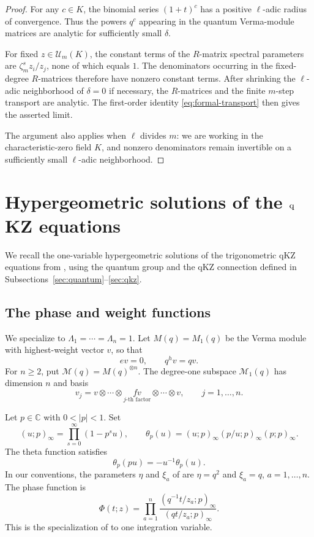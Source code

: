 \documentclass[12pt]{amsart}
\theoremstyle{definition}
\numberwithin{equation}{section}
\theoremstyle{definition}
\let\mc\mathcal
\let\La\Lambda
\let\tht\theta
\let\ox\otimes
\let\ge\geqslant
\def\C{{\mathbb C}}
\def\beq{\begin{equation}}
\def\eeq{\end{equation}}
\begin{document}
\begin{proof}
For any $c\in K$, the binomial series $(1+t)^c$ has a
positive $\ell$-adic radius of convergence.  Thus the powers
$q^c$ appearing in the quantum Verma-module matrices are
analytic for sufficiently small $\delta$.

For fixed $z\in\mc U_m(K)$, the constant terms of the
$R$-matrix spectral parameters are
$\zeta_m^s z_i/z_j$, none of which equals $1$.
The denominators occurring in the fixed-degree $R$-matrices
therefore have nonzero constant terms.  After shrinking
the $\ell$-adic neighborhood of $\delta=0$ if necessary,
the $R$-matrices and the finite $m$-step transport are analytic.
The first-order identity \eqref{eq:formal-transport} then
gives the asserted limit.

The argument also applies when $\ell$ divides $m$:
we are working in the characteristic-zero field $K$,
and nonzero denominators remain invertible on a sufficiently
small $\ell$-adic neighborhood.
\end{proof}



\section{Hypergeometric solutions of the \texorpdfstring{$\mathrm{\lowercase{q}}$KZ}{qKZ} equations}
\label{sec:hyper-qkz}

We recall the one-variable hypergeometric solutions of the
trigonometric qKZ equations from \cite{TV97}, using the quantum group
and the qKZ connection defined in Subsections~\ref{sec:quantum}--\ref{sec:qkz}.

\subsection{The phase and weight functions}

We specialize to $\La_1=\cdots=\La_n=1$.
Let $M(q)=M_1(q)$ be the Verma module with highest-weight vector $v$,
so that
\beq\label{eq:hyp-highest}
 ev=0,\qquad q^h v=qv.
\eeq
For $n\ge2$, put $\mc M(q)=M(q)^{\ox n}$.
The degree-one subspace $\mc M_1(q)$ has dimension $n$ and basis
\beq\label{eq:hyp-basis}
 v_j=v\ox\cdots\ox
 \underset{j\text{-th factor}}{fv}
 \ox\cdots\ox v,
 \qquad j=1,\ldots,n.
\eeq

Let $p\in\C$ with $0<|p|<1$.  Set
\beq\label{eq:hyp-theta-def}
 (u;p)_\infty=\prod_{s=0}^\infty(1-p^su),\qquad
 \tht_p(u)=(u;p)_\infty(p/u;p)_\infty(p;p)_\infty.
\eeq
The theta function satisfies
\beq\label{eq:hyp-theta}
 \tht_p(pu)=-u^{-1}\tht_p(u).
\eeq
In our conventions, the parameters $\eta$ and $\xi_a$ of
\cite{TV97} are $\eta=q^2$ and $\xi_a=q$, $a=1,\ldots,n$.
The phase function is
\beq\label{eq:hyp-phase}
 \Phi(t;z)=\prod_{a=1}^n
 \frac{(q^{-1}t/z_a;p)_\infty}
      {(qt/z_a;p)_\infty}.
\eeq
This is the specialization of \cite[(5.2)]{TV97} to one
integration variable.
\end{document}
